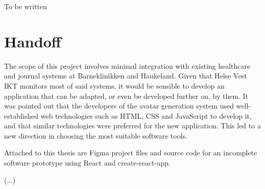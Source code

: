To be written

\section{Handoff}

The scope of this project involves minimal integration with existing healthcare and journal systems at Barneklinikken and Haukeland. Given that Helse Vest IKT monitors most of said systems, it would be sensible to develop an application that can be adapted, or even be developed further on, by them. It was pointed out that the developers of the avatar generation system used well-established web technologies such as HTML, CSS and JavaScript to develop it, and that similar technologies were preferred for the new application. This led to a new direction in choosing the most suitable software tools.

Attached to this thesis are Figma project files and source code for an incomplete software prototype using React and create-react-app.

(...)
